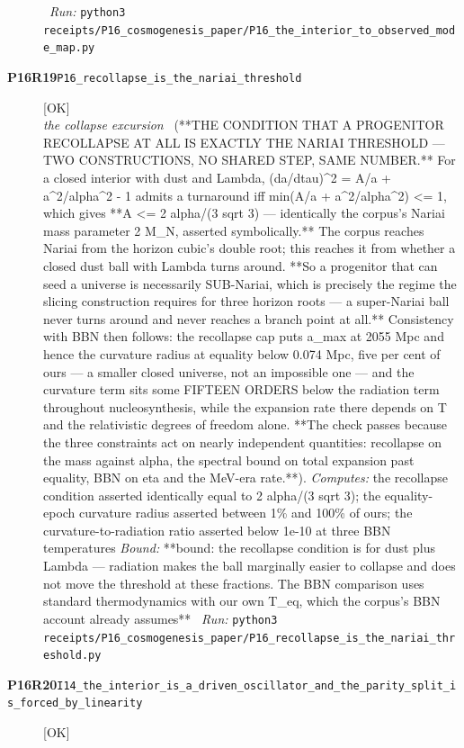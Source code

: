 \begin{description}
\ \emph{Run:} \texttt{python3 receipts/P16\_cosmogenesis\_paper/P16\_the\_interior\_to\_observed\_mode\_map.py}
\item[\rcptlabel{P16_recollapse_is_the_nariai_threshold}{P16R19}\textbf{P16R19}\quad\texttt{P16\_recollapse\_is\_the\_nariai\_threshold}]\hfill\textsf{[OK]}\\
\textit{the collapse excursion} \ (**THE CONDITION THAT A PROGENITOR RECOLLAPSE AT ALL IS EXACTLY THE NARIAI THRESHOLD --- TWO CONSTRUCTIONS, NO SHARED STEP, SAME NUMBER.** For a closed interior with dust and Lambda, (da/dtau)\textasciicircum{}2 = A/a + a\textasciicircum{}2/alpha\textasciicircum{}2 - 1 admits a turnaround iff min(A/a + a\textasciicircum{}2/alpha\textasciicircum{}2) <= 1, which gives **A <= 2 alpha/(3 sqrt 3) --- identically the corpus's Nariai mass parameter 2 M\_N, asserted symbolically.** The corpus reaches Nariai from the horizon cubic's double root; this reaches it from whether a closed dust ball with Lambda turns around. **So a progenitor that can seed a universe is necessarily SUB-Nariai, which is precisely the regime the slicing construction requires for three horizon roots --- a super-Nariai ball never turns around and never reaches a branch point at all.** Consistency with BBN then follows: the recollapse cap puts a\_max at 2055 Mpc and hence the curvature radius at equality below 0.074 Mpc, five per cent of ours --- a smaller closed universe, not an impossible one --- and the curvature term sits some FIFTEEN ORDERS below the radiation term throughout nucleosynthesis, while the expansion rate there depends on T and the relativistic degrees of freedom alone. **The check passes because the three constraints act on nearly independent quantities: recollapse on the mass against alpha, the spectral bound on total expansion past equality, BBN on eta and the MeV-era rate.**). 
\emph{Computes:} the recollapse condition asserted identically equal to 2 alpha/(3 sqrt 3); the equality-epoch curvature radius asserted between 1\% and 100\% of ours; the curvature-to-radiation ratio asserted below 1e-10 at three BBN temperatures
 \emph{Bound:} **bound: the recollapse condition is for dust plus Lambda --- radiation makes the ball marginally easier to collapse and does not move the threshold at these fractions. The BBN comparison uses standard thermodynamics with our own T\_eq, which the corpus's BBN account already assumes**
\ \emph{Run:} \texttt{python3 receipts/P16\_cosmogenesis\_paper/P16\_recollapse\_is\_the\_nariai\_threshold.py}
\item[\rcptlabel{I14_the_interior_is_a_driven_oscillator_and_the_parity_split_is_forced_by_linearity}{P16R20}\textbf{P16R20}\quad\texttt{I14\_the\_interior\_is\_a\_driven\_oscillator\_and\_the\_parity\_split\_is\_forced\_by\_linearity}]\hfill\textsf{[OK]}\\

\end{description}
